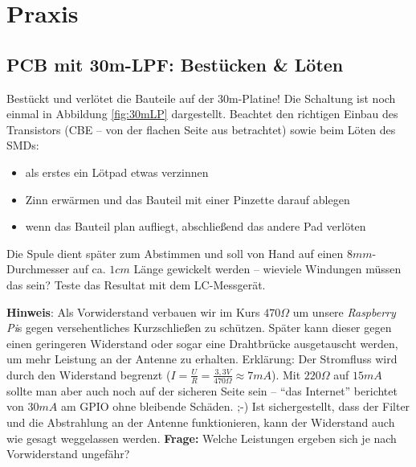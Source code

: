 \section*{Praxis}

\subsection*{PCB mit 30m-LPF: Bestücken \& Löten}

Bestückt und verlötet die Bauteile auf der 30m-Platine! Die Schaltung ist noch
einmal in Abbildung \ref{fig:30mLP} dargestellt. Beachtet den richtigen Einbau
des Transistors (CBE -- von der flachen Seite aus betrachtet) sowie beim Löten
des SMDs:

\begin{itemize}
    \item als erstes ein Lötpad etwas verzinnen
    \item Zinn erwärmen und das Bauteil mit einer Pinzette darauf ablegen
    \item wenn das Bauteil plan aufliegt, abschließend das andere Pad verlöten
\end{itemize}



Die Spule dient später zum Abstimmen und soll von Hand auf einen $8
mm$-Durchmesser auf ca. $1 cm$ Länge gewickelt werden -- wieviele Windungen
müssen das sein? Teste das Resultat mit dem LC-Messgerät.

\textbf{Hinweis}: Als Vorwiderstand verbauen wir im Kurs $470 \Omega$ um unsere
\emph{Raspberry Pi}s gegen versehentliches Kurzschließen zu schützen. Später
kann dieser gegen einen geringeren Widerstand oder sogar eine Drahtbrücke
ausgetauscht werden, um mehr Leistung an der Antenne zu erhalten. Erklärung: Der
Stromfluss wird durch den Widerstand begrenzt ($I = \frac{U}{R} = \frac{3,3
V}{470 \Omega} \approx 7 mA$). Mit $220 \Omega$ auf $15 mA$ sollte man aber auch
noch auf der sicheren Seite sein -- "`das Internet"' berichtet von $30 mA$ am
GPIO ohne bleibende Schäden. ;-) Ist sichergestellt, dass der Filter und die
Abstrahlung an der Antenne funktionieren, kann der Widerstand auch wie gesagt
weggelassen werden. \textbf{Frage:} Welche Leistungen ergeben sich je nach
Vorwiderstand ungefähr?

